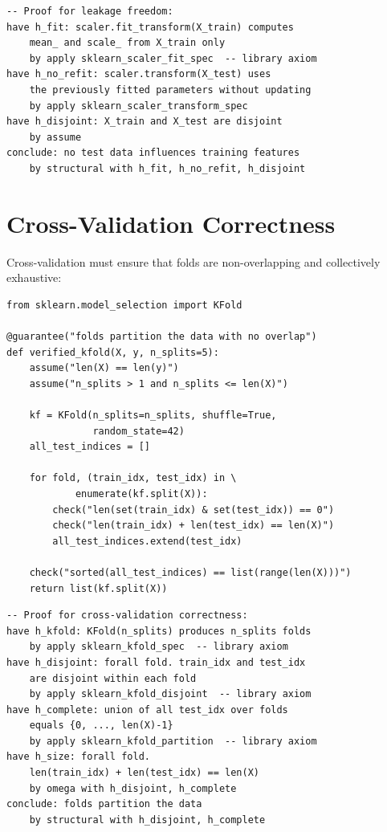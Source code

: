 \documentclass[11pt,a4paper]{report}
\theoremstyle{definition}
\theoremstyle{plain}
\begin{document}
\begin{lstlisting}[style=proof]
-- Proof for leakage freedom:
have h_fit: scaler.fit_transform(X_train) computes
    mean_ and scale_ from X_train only
    by apply sklearn_scaler_fit_spec  -- library axiom
have h_no_refit: scaler.transform(X_test) uses
    the previously fitted parameters without updating
    by apply sklearn_scaler_transform_spec
have h_disjoint: X_train and X_test are disjoint
    by assume
conclude: no test data influences training features
    by structural with h_fit, h_no_refit, h_disjoint
\end{lstlisting}

\section{Cross-Validation Correctness}

Cross-validation must ensure that folds are non-overlapping and
collectively exhaustive:

\begin{lstlisting}[style=synhopy]
from sklearn.model_selection import KFold

@guarantee("folds partition the data with no overlap")
def verified_kfold(X, y, n_splits=5):
    assume("len(X) == len(y)")
    assume("n_splits > 1 and n_splits <= len(X)")

    kf = KFold(n_splits=n_splits, shuffle=True,
               random_state=42)
    all_test_indices = []

    for fold, (train_idx, test_idx) in \
            enumerate(kf.split(X)):
        check("len(set(train_idx) & set(test_idx)) == 0")
        check("len(train_idx) + len(test_idx) == len(X)")
        all_test_indices.extend(test_idx)

    check("sorted(all_test_indices) == list(range(len(X)))")
    return list(kf.split(X))
\end{lstlisting}

\begin{lstlisting}[style=proof]
-- Proof for cross-validation correctness:
have h_kfold: KFold(n_splits) produces n_splits folds
    by apply sklearn_kfold_spec  -- library axiom
have h_disjoint: forall fold. train_idx and test_idx
    are disjoint within each fold
    by apply sklearn_kfold_disjoint  -- library axiom
have h_complete: union of all test_idx over folds
    equals {0, ..., len(X)-1}
    by apply sklearn_kfold_partition  -- library axiom
have h_size: forall fold.
    len(train_idx) + len(test_idx) == len(X)
    by omega with h_disjoint, h_complete
conclude: folds partition the data
    by structural with h_disjoint, h_complete
\end{lstlisting}
\end{document}
